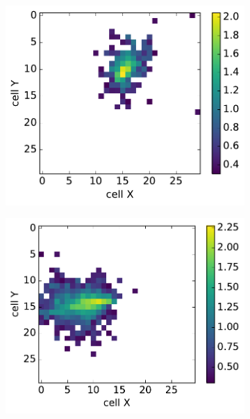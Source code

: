 \begin{figure}
\begin{subfigure}{0.24\textwidth}
    \includegraphics[width=1\textwidth]{figures/2_real.pdf}
  \end{subfigure}
    \begin{subfigure}{0.24\textwidth}
    \centering
    \includegraphics[width=1\textwidth]{figures/3_real.pdf}

\end{subfigure}
\end{figure}
